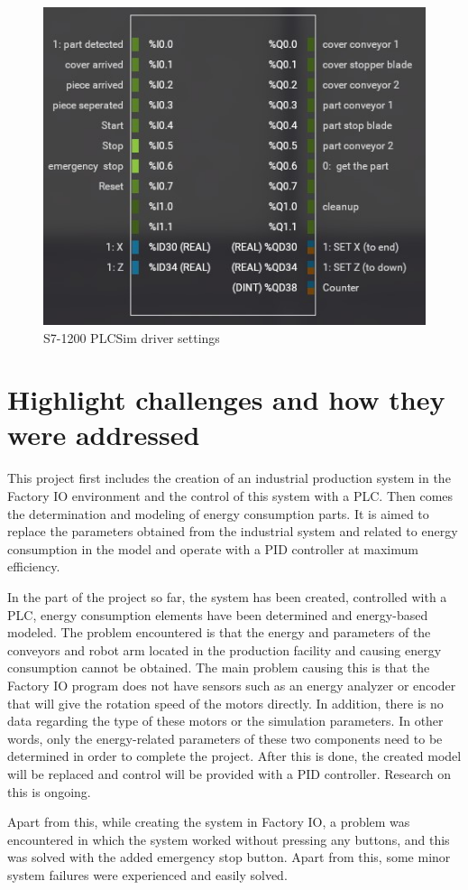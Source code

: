 \begin{figure}[H]
    \centering
    \includegraphics[width=0.5\columnwidth]{imgs/io/11.jpg}
    \caption[S7-1200 PLCSim driver settings]{S7-1200 PLCSim driver settings}
    \label{fig-magnitude}
\end{figure}%

\section{Highlight challenges and how they were addressed}
This project first includes the creation of an industrial production system in the Factory IO environment and the control of this system with a PLC. Then comes the determination and modeling of energy consumption parts. It is aimed to replace the parameters obtained from the industrial system and related to energy consumption in the model and operate with a PID controller at maximum efficiency.

In the part of the project so far, the system has been created, controlled with a PLC, energy consumption elements have been determined and energy-based modeled. The problem encountered is that the energy and parameters of the conveyors and robot arm located in the production facility and causing energy consumption cannot be obtained. The main problem causing this is that the Factory IO program does not have sensors such as an energy analyzer or encoder that will give the rotation speed of the motors directly. In addition, there is no data regarding the type of these motors or the simulation parameters. In other words, only the energy-related parameters of these two components need to be determined in order to complete the project. After this is done, the created model will be replaced and control will be provided with a PID controller. Research on this is ongoing.

Apart from this, while creating the system in Factory IO, a problem was encountered in which the system worked without pressing any buttons, and this was solved with the added emergency stop button. Apart from this, some minor system failures were experienced and easily solved.

